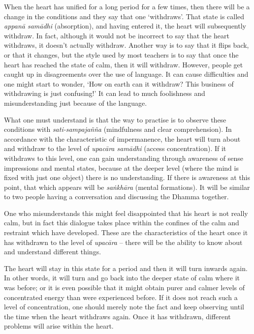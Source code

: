 When the heart has unified for a long period for a few times, then there
will be a change in the conditions and they say that one `withdraws'. 
That state is called \emph{appanā samādhi} (absorption), and having
entered it, the heart will subsequently withdraw. In fact, although it
would not be incorrect to say that the heart withdraws, it doesn't
actually withdraw. Another way is to say that it flips back, or that it
changes, but the style used by most teachers is to say that once the
heart has reached the state of calm, then it will withdraw. However, 
people get caught up in disagreements over the use of language. It can
cause difficulties and one might start to wonder, `How on earth can it
withdraw? This business of withdrawing is just confusing!' It can lead
to much foolishness and misunderstanding just because of the language. 

What one must understand is that the way to practise is to observe these
conditions with \emph{sati-sampajañña} (mindfulness and clear
comprehension). In accordance with the characteristic of impermanence, 
the heart will turn about and withdraw to the level of \emph{upacāra
samādhi} (access concentration). If it withdraws to this level, one can
gain understanding through awareness of sense impressions and mental
states, because at the deeper level (where the mind is fixed with just
one object) there is no understanding. If there is awareness at this
point, that which appears will be \emph{saṅkhāra} (mental formations). 
It will be similar to two people having a conversation and discussing
the Dhamma together.

One who misunderstands this might feel disappointed
that his heart is not really calm, but in fact this dialogue takes place
within the confines of the calm and restraint which have developed. 
These are the characteristics of the heart once it has withdrawn to the
level of \emph{upacāra} -- there will be the ability to know about and
understand different things. 

The heart will stay in this state for a period and then it will turn
inwards again. In other words, it will turn and go back into the deeper
state of calm where it was before; or it is even possible that it might
obtain purer and calmer levels of concentrated energy than were
experienced before. If it does not reach such a level of concentration, 
one should merely note the fact and keep observing until the time when
the heart withdraws again. Once it has withdrawn, different problems
will arise within the heart. 


